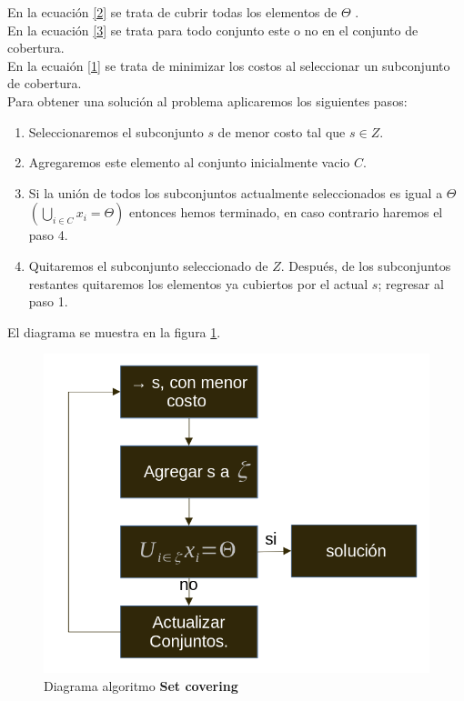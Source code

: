 \documentclass{article}
\newcommand{\setcover}{{\bfseries Set covering }}
\theoremstyle{mytheoremstyle}
\theoremstyle{mytheoremstyle}
\theoremstyle{myproblemstyle}
\begin{document}
En la ecuación \ref{2} se trata de cubrir todas los elementos de $\varTheta$ .
\\ En la ecuación \ref{3} se trata para todo conjunto este o no en el conjunto de cobertura.
\\ En la ecuaión \ref{1} se trata de minimizar los costos al seleccionar un subconjunto de cobertura.
\\ Para obtener una solución al problema aplicaremos los siguientes pasos: \vspace{0.1 in}
\begin{tcolorbox}[colback=yellow!50!black,colframe=brown!50!black,title=Pasos a seguir: ]
    \begin{enumerate}
        \item Seleccionaremos el subconjunto  $s$ de menor costo tal que $s \in Z$.
        \item Agregaremos este elemento al conjunto inicialmente vacio $C$.
        \item Si la unión de todos los subconjuntos actualmente seleccionados es igual a $\varTheta $ $\left( \displaystyle \bigcup_{i \in C} {x_i} = \varTheta \right)$ entonces hemos terminado, en caso contrario haremos el paso 4.
        \item Quitaremos el subconjunto seleccionado de $Z$. Después, de los subconjuntos restantes quitaremos los elementos ya cubiertos por el actual $s$; regresar al paso 1.
    \end{enumerate}
\end{tcolorbox}
El diagrama se muestra en la figura \ref{diagrama}.
\begin{figure}[h!]
    \centering
    \includegraphics[scale = 0.40]{diagrama set covering.png}
    \caption{Diagrama algoritmo \setcover}
    \label{diagrama}
\end{figure}
\end{document}

